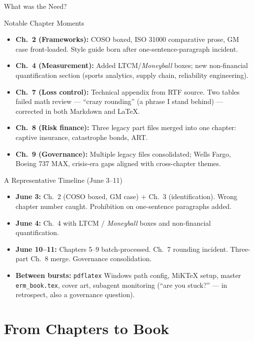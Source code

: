 \documentclass[11pt, aspectratio=169]{beamer}
\begin{document}
\begin{frame}{What was the Need?}
\begin{frame}{Notable Chapter Moments}
\begin{itemize}
  \item \textbf{Ch.\ 2 (Frameworks):} COSO boxed, ISO 31000 comparative prose,
        GM case front-loaded. Style guide born after one-sentence-paragraph incident.
  \item \textbf{Ch.\ 4 (Measurement):} Added LTCM/\textit{Moneyball} boxes;
        new non-financial quantification section (sports analytics, supply chain,
        reliability engineering).
  \item \textbf{Ch.\ 7 (Loss control):} Technical appendix from RTF source.
        Two tables failed math review --- ``crazy rounding'' (a phrase I stand behind)
        --- corrected in both Markdown and \LaTeX{}.
  \item \textbf{Ch.\ 8 (Risk finance):} Three legacy part files merged into one chapter:
        captive insurance, catastrophe bonds, ART.
  \item \textbf{Ch.\ 9 (Governance):} Multiple legacy files consolidated;
        Wells Fargo, Boeing 737 MAX, crisis-era gaps aligned with cross-chapter themes.
\end{itemize}
\end{frame}

\begin{frame}{A Representative Timeline (June 3--11)}
\begin{itemize}
  \item \textbf{June 3:} Ch.\ 2 (COSO boxed, GM case) + Ch.\ 3 (identification).
        Wrong chapter number caught. Prohibition on one-sentence paragraphs added.
  \item \textbf{June 4:} Ch.\ 4 with LTCM / \textit{Moneyball} boxes and non-financial
        quantification.
  \item \textbf{June 10--11:} Chapters 5--9 batch-processed. Ch.\ 7 rounding incident.
        Three-part Ch.\ 8 merge. Governance consolidation.
  \item \textbf{Between bursts:} \texttt{pdflatex} Windows path config, MiKTeX setup,
        master \texttt{erm\_book.tex}, cover art, subagent monitoring
        (``are you stuck?'' --- in retrospect, also a governance question).
\end{itemize}
\end{frame}

\section{From Chapters to Book}


\end{frame}
\end{document}
